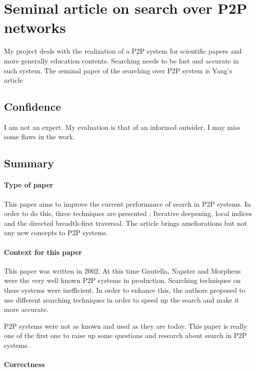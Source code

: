\section{Seminal article on search over P2P networks}

My project deals with the realization of a P2P system for
scientific papers and more generally education contents.
Searching needs to be fast and accurate in such system.
The seminal paper of the searching over P2P system is Yang's article \cite{Yang02improvingsearch}

\subsection{Confidence}

I am not an expert. My evaluation is that of an informed
outsider. I may miss some flaws in the work.

\subsection{Summary}

\paragraph{Type of paper}

This paper aims to improve the current performance of search in P2P systems.
In order to do this, three techniques are presented : Iterative deepening, local
indices and the directed breadth-first traversal. The article brings ameliorations
but not any new concepts to P2P systems.

\paragraph{Context for this paper}

This paper was written in 2002. At this time Gnutella, Napster and Morpheus were the
very well known P2P systems in production. Searching techniques on these systems
were inefficient. In order to enhance this, the authors proposed to use different
searching techniques in order to speed up the search and make it more accurate.

P2P systems were not as known and used as they are today. This paper is really
one of the first one to raise up some questions and research about search in P2P
systems.

\paragraph{Correctness}

